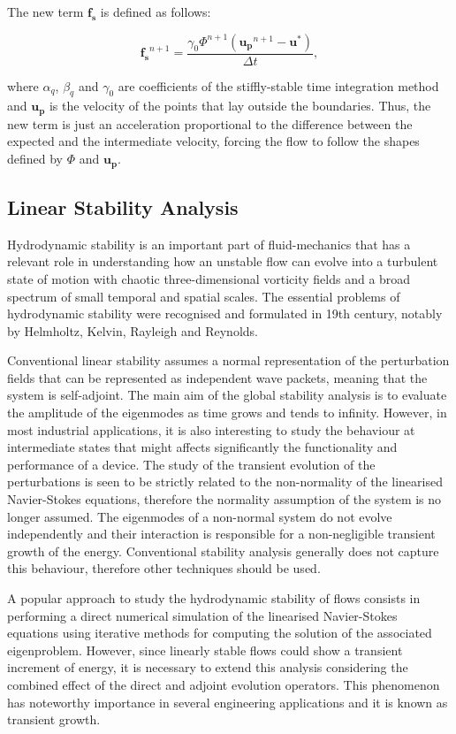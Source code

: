 The new term $\mathbf{f_s}$ is defined as follows:

\begin{equation}
    \mathbf{f_s}^{n+1} = \frac{\gamma_0\Phi^{n+1}(\mathbf{u_p}^{n+1}-
        \mathbf{u^*})}{\Delta t},
\end{equation}

where $\alpha_q$, $\beta_q$ and $\gamma_0$ are coefficients of the
stiffly-stable time integration method and $\mathbf{u_p}$ is the velocity of
the points that lay outside the boundaries. Thus, the new term is just an
acceleration proportional to the difference between the expected and the
intermediate velocity, forcing the flow to follow the shapes defined by $\Phi$
and $\mathbf{u_p}$. 

\subsection{Linear Stability Analysis}

Hydrodynamic stability is an important part of fluid-mechanics that has a relevant role in understanding how an unstable flow can evolve into a turbulent state of motion with chaotic three-dimensional vorticity fields and a broad spectrum of small temporal and spatial scales. The essential problems of hydrodynamic stability were recognised and formulated in 19th century, notably by Helmholtz, Kelvin, Rayleigh and Reynolds.

Conventional linear stability assumes a normal representation of the perturbation fields that can be represented as independent wave packets, meaning that the system is self-adjoint. The main aim of the global stability analysis is to evaluate the amplitude of the eigenmodes as time grows and tends to infinity. However, in most industrial applications, it is also interesting to study the behaviour at intermediate states that might affects significantly the functionality and performance of a device. The study of the transient evolution of the perturbations is seen to be strictly related to the non-normality of the linearised Navier-Stokes equations, therefore the normality assumption of the system is no longer assumed. The eigenmodes of a non-normal system do not evolve independently and their interaction is responsible for a non-negligible transient growth of the energy. Conventional stability analysis generally does not capture this behaviour, therefore other techniques should be used.

A popular approach to study the hydrodynamic stability of flows consists in performing a direct numerical simulation of the linearised Navier-Stokes equations using iterative methods for computing the solution of the associated eigenproblem. However, since linearly stable flows could show a transient increment of energy, it is necessary to extend this analysis considering the combined effect of the direct and adjoint evolution operators. This phenomenon has noteworthy importance in several engineering applications and it is known as transient growth.

